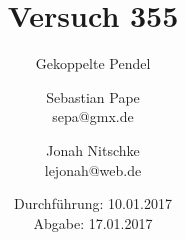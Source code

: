 



\title{Versuch 355}
\subtitle{Gekoppelte Pendel}
\author{Sebastian Pape\\
        sepa@gmx.de \and
        Jonah Nitschke\\
        lejonah@web.de}
\date{Durchführung: 10.01.2017\\
      Abgabe: 17.01.2017}

\maketitle













